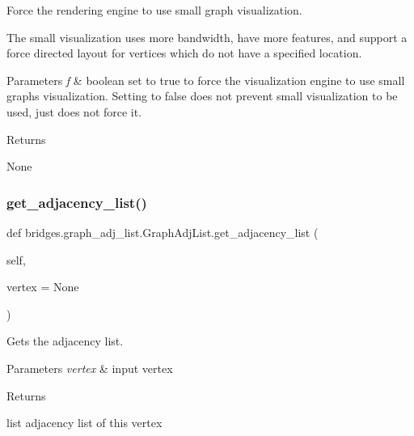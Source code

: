 Force the rendering engine to use small graph visualization. 

The small visualization uses more bandwidth, have more features, and support a force directed layout for vertices which do not have a specified location.


\begin{DoxyParams}{Parameters}
{\em f} & boolean set to true to force the visualization engine to use small graphs visualization. Setting to false does not prevent small visualization to be used, just does not force it. \\
\hline
\end{DoxyParams}
\begin{DoxyReturn}{Returns}


None 
\end{DoxyReturn}
\mbox{\label{classbridges_1_1graph__adj__list_1_1_graph_adj_list_a523adce952c66505abc5ad14a83ae4c4}} 
\subsubsection{\texorpdfstring{get\+\_\+adjacency\+\_\+list()}{get\_adjacency\_list()}}
{\footnotesize\ttfamily def bridges.\+graph\+\_\+adj\+\_\+list.\+Graph\+Adj\+List.\+get\+\_\+adjacency\+\_\+list (\begin{DoxyParamCaption}\item[{}]{self,  }\item[{}]{vertex = {\ttfamily None} }\end{DoxyParamCaption})}



Gets the adjacency list. 


\begin{DoxyParams}{Parameters}
{\em vertex} & input vertex \\
\hline
\end{DoxyParams}
\begin{DoxyReturn}{Returns}


list adjacency list of this vertex 
\end{DoxyReturn}
\mbox{\label{classbridges_1_1graph__adj__list_1_1_graph_adj_list_aaffde74237de001232e0996a8c64ab82}} 
